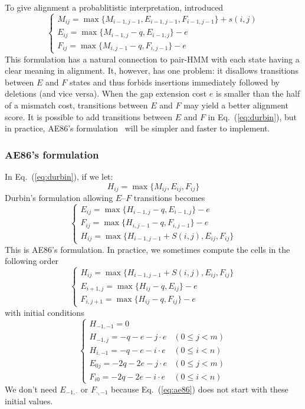 \documentclass{bioinfo}
\begin{document}
To give alignment a probablitistic interpretation, \citep{Durbin:1998uq} 
introduced
\begin{equation}\label{eq:durbin}
\left\{\begin{array}{l}
M_{ij}=\max\{M_{i-1,j-1}, E_{i-1,j-1}, F_{i-1,j-1}\} + s(i,j)\\
E_{ij}=\max\{M_{i-1,j}-q, E_{i-1,j}\} - e\\
F_{ij}=\max\{M_{i,j-1}-q, F_{i,j-1}\} - e
\end{array}\right.
\end{equation}
This formulation has a natural connection to pair-HMM with each state having a
clear meaning in alignment. It, however, has one problem: it disallows
transitions between $E$ and $F$ states and thus forbids insertions immediately
followed by deletions (and vice versa). When the gap extension cost $e$ is
smaller than the half of a mismatch cost, transitions between $E$ and $F$ may
yield a better alignment score. It is possible to add transitions between $E$
and $F$ in Eq.~(\ref{eq:durbin}), but in practice, AE86's
formulation~\citep{Altschul:1986aa} will be simpler and faster to implement.

\subsubsection{AE86's formulation}

In Eq.~(\ref{eq:durbin}), if we let:
\[H_{ij}=\max\{M_{ij},E_{ij},F_{ij}\}\]
Durbin's formulation allowing $E$--$F$ transitions becomes
\begin{equation*}
\left\{\begin{array}{l}
E_{ij}=\max\{H_{i-1,j}-q, E_{i-1,j}\} - e \\
F_{ij}=\max\{H_{i,j-1}-q, F_{i,j-1}\} - e \\
H_{ij}=\max\{H_{i-1,j-1}+S(i,j), E_{ij}, F_{ij}\}
\end{array}\right.
\end{equation*}
This is AE86's formulation. In practice, we sometimes compute the cells in the
following order
\begin{equation}\label{eq:ae86}
\left\{\begin{array}{l}
H_{ij}=\max\{H_{i-1,j-1}+S(i,j), E_{ij}, F_{ij}\}\\
E_{i+1,j}=\max\{H_{ij}-q, E_{ij}\} - e \\
F_{i,j+1}=\max\{H_{ij}-q, F_{ij}\} - e
\end{array}\right.
\end{equation}
with initial conditions
\begin{equation}
\left\{\begin{array}{ll}
H_{-1,-1}=0\\
H_{-1,j}=-q-e-j\cdot e & (0\le j<m)\\
H_{i,-1}=-q-e-i\cdot e & (0\le i<n)\\
E_{0j}=-2q-2e-j\cdot e & (0\le j<m)\\
F_{i0}=-2q-2e-i\cdot e & (0\le i<n)
\end{array}\right.
\end{equation}
We don't need $E_{-1,\cdot}$ or $F_{\cdot,-1}$ because Eq.~(\ref{eq:ae86})
does not start with these initial values.
\end{document}
